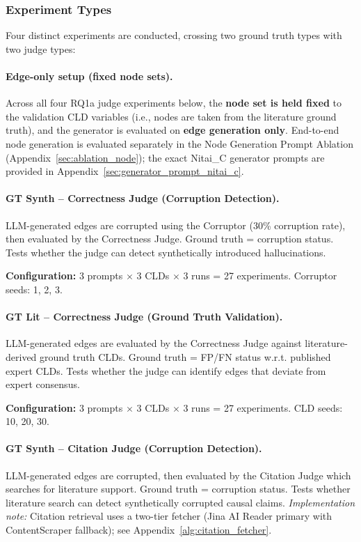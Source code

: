 \subsubsection{Experiment Types}

Four distinct experiments are conducted, crossing two ground truth types with two judge types:

\paragraph{Edge-only setup (fixed node sets).}
Across all four RQ1a judge experiments below, the \textbf{node set is held fixed} to the validation CLD variables (i.e., nodes are taken from the literature ground truth), and the generator is evaluated on \textbf{edge generation only}. End-to-end node generation is evaluated separately in the Node Generation Prompt Ablation (Appendix~\ref{sec:ablation_node}); the exact Nitai\_C generator prompts are provided in Appendix~\ref{sec:generator_prompt_nitai_c}.

\paragraph{GT Synth -- Correctness Judge (Corruption Detection).}
LLM-generated edges are corrupted using the Corruptor (30\% corruption rate), then evaluated by the Correctness Judge. Ground truth = corruption status. Tests whether the judge can detect synthetically introduced hallucinations.

\textbf{Configuration:} 3 prompts $\times$ 3 CLDs $\times$ 3 runs = 27 experiments. Corruptor seeds: 1, 2, 3.

\paragraph{GT Lit -- Correctness Judge (Ground Truth Validation).}
LLM-generated edges are evaluated by the Correctness Judge against literature-derived ground truth CLDs. Ground truth = FP/FN status w.r.t. published expert CLDs. Tests whether the judge can identify edges that deviate from expert consensus.

\textbf{Configuration:} 3 prompts $\times$ 3 CLDs $\times$ 3 runs = 27 experiments. CLD seeds: 10, 20, 30.

\paragraph{GT Synth -- Citation Judge (Corruption Detection).}
LLM-generated edges are corrupted, then evaluated by the Citation Judge which searches for literature support. Ground truth = corruption status. Tests whether literature search can detect synthetically corrupted causal claims.
\textit{Implementation note:} Citation retrieval uses a two-tier fetcher (Jina AI Reader primary with ContentScraper fallback); see Appendix~\ref{alg:citation_fetcher}.

